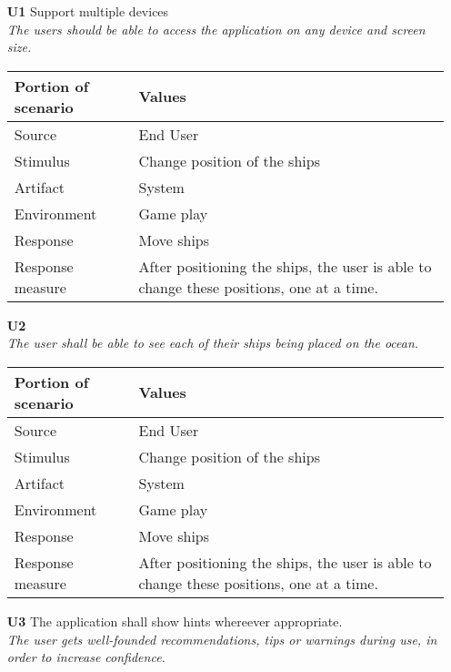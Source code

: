 \begin{itemize}
    \item[\textbf{U1}] Support multiple devices \\
    \textit{\small{The users should be able to access the application on any device and screen size.}}
        
    \begin{tabular}{| l | p{7cm} |}
        \hline
        \rowcolor[gray]{0.8}
        \textbf{Portion of scenario} & \textbf{Values} \\
        \hline
        Source & End User \\
        Stimulus & Change position of the ships \\
        Artifact & System \\
        Environment & Game play \\
        Response & Move ships  \\
        Response measure    & After positioning the ships, the user is able to change these positions, one  at a time. \\
        \hline
    \end{tabular}

    \item[\textbf{U2}]  \\
    \textit{\small{The user shall be able to see each of their ships being placed on the ocean.}}
        
    \begin{tabular}{| l | p{7cm} |}
        \hline
        \rowcolor[gray]{0.8}
        \textbf{Portion of scenario} & \textbf{Values} \\
        \hline
        Source & End User \\
        Stimulus & Change position of the ships \\
        Artifact & System \\
        Environment & Game play \\
        Response & Move ships  \\
        Response measure & After positioning the ships, the user is able to change these positions, one  at a time. \\
        \hline
    \end{tabular}

    \item[\textbf{U3}] The application shall show hints whereever appropriate. \\
        \textit{\small{The user gets well-founded recommendations, tips or warnings during use, in order to increase confidence.}}
        

\end{itemize}

